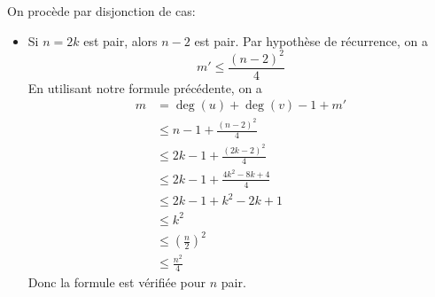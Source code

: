 \begin{td-sol}[]
\begin{enumerate}
        On procède par disjonction de cas:
        \begin{itemize}
            \item Si \(n = 2k\) est pair, alors \(n-2\) est pair. Par hypothèse de récurrence,
            on a
            \begin{equation*}
                m' \leq \frac{{(n-2)}^2}{4}
            \end{equation*}
            En utilisant notre formule précédente, on a
            \begin{equation*}
                \begin{aligned}
                    m
                    &= \deg(u) + \deg(v) - 1 + m' \\
                    &\leq n - 1 + \frac{{(n-2)}^2}{4} \\
                    &\leq 2k - 1 + \frac{{(2k-2)}^2}{4} \\
                    &\leq 2k - 1 + \frac{4k^2 - 8k + 4}{4} \\
                    &\leq 2k - 1 + k^2 - 2k + 1 \\
                    &\leq k^2 \\
                    &\leq {(\frac{n}{2})}^2 \\
                    &\leq \frac{n^2}{4}
                \end{aligned}
            \end{equation*}
            Donc la formule est vérifiée pour \(n\) pair.


\end{itemize}
\end{enumerate}
\end{td-sol}
